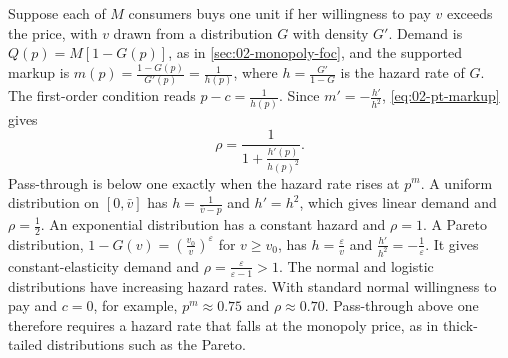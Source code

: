 \begin{remark}\label{rem:02-pt-hazard}
Suppose each of $M$ consumers buys one unit if her willingness to pay $v$ exceeds the price, with $v$ drawn from a
distribution $G$ with density $G'$. Demand is $Q(p) = M[1 - G(p)]$, as in \cref{sec:02-monopoly-foc}, and the
supported markup is $m(p) = \frac{1 - G(p)}{G'(p)} = \frac{1}{h(p)}$, where $h = \frac{G'}{1 - G}$ is the hazard rate
of $G$. The
first-order condition reads $p - c = \frac{1}{h(p)}$. Since $m' = -\frac{h'}{h^2}$, \eqref{eq:02-pt-markup} gives
\begin{equation*}
\rho = \frac{1}{1 + \frac{h'(p)}{h(p)^2}} .
\end{equation*}
Pass-through is below one exactly when the hazard rate rises at $p^m$. A uniform distribution on $[0, \bar v]$ has
$h = \frac{1}{\bar v - p}$ and $h' = h^2$, which gives linear demand and $\rho = \frac{1}{2}$. An exponential
distribution has a constant hazard and $\rho = 1$. A Pareto distribution, $1 - G(v) = (\frac{v_0}{v})^{\varepsilon}$
for $v \ge v_0$, has $h = \frac{\varepsilon}{v}$ and $\frac{h'}{h^2} = -\frac{1}{\varepsilon}$. It gives
constant-elasticity demand and $\rho = \frac{\varepsilon}{\varepsilon - 1} > 1$. The normal and logistic
distributions have increasing hazard rates. With standard normal willingness to pay and $c = 0$, for example,
$p^m \approx 0.75$ and $\rho \approx 0.70$. Pass-through above one therefore requires a hazard rate that falls
at the monopoly price, as in thick-tailed distributions such as the Pareto.
\end{remark}

